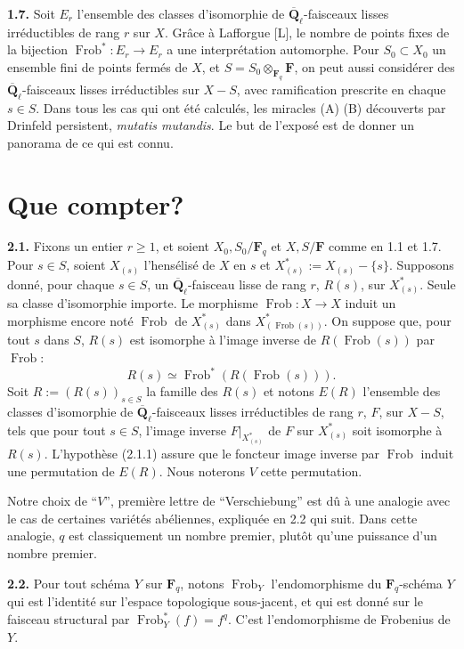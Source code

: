 \documentclass[11pt]{article}
\newcommand{\Fq}{\mathbf{F}_q}
\newcommand{\F}{\mathbf{F}}
\newcommand{\Qbl}{\overline{\mathbf{Q}}_{\ell}}
\newcommand{\Frob}{\operatorname{Frob}}
\newcommand{\para}[1]{\medskip\noindent\textbf{#1}\enspace}
\begin{document}
\para{1.7.} Soit \(E_r\) l'ensemble des classes d'isomorphie de \(\Qbl\)-faisceaux lisses irréductibles de rang \(r\) sur \(X\). Grâce à Lafforgue [L], le nombre de points fixes de la bijection \(\Frob^*:E_r\to E_r\) a une interprétation automorphe. Pour \(S_0\subset X_0\) un ensemble fini de points fermés de \(X\), et \(S=S_0\otimes_{\Fq}\F\), on peut aussi considérer des \(\Qbl\)-faisceaux lisses irréductibles sur \(X-S\), avec ramification prescrite en chaque \(s\in S\). Dans tous les cas qui ont été calculés, les miracles (A) (B) découverts par Drinfeld persistent, \textit{mutatis mutandis}. Le but de l'exposé est de donner un panorama de ce qui est connu.

\section{Que compter?}

\para{2.1.} Fixons un entier \(r\ge 1\), et soient \(X_0,S_0/\Fq\) et \(X,S/\F\) comme en 1.1 et 1.7. Pour \(s\in S\), soient \(X_{(s)}\) l'hensélisé de \(X\) en \(s\) et \(X_{(s)}^*:=X_{(s)}-\{s\}\). Supposons donné, pour chaque \(s\in S\), un \(\Qbl\)-faisceau lisse de rang \(r\), \(R(s)\), sur \(X_{(s)}^*\). Seule sa classe d'isomorphie importe. Le morphisme \(\Frob:X\to X\) induit un morphisme encore noté \(\Frob\) de \(X_{(s)}^*\) dans \(X_{(\Frob(s))}^*\). On suppose que, pour tout \(s\) dans \(S\), \(R(s)\) est isomorphe à l'image inverse de \(R(\Frob(s))\) par \(\Frob\):
\begin{equation}
R(s)\simeq \Frob^*(R(\Frob(s))).
\tag{2.1.1}
\end{equation}
Soit \(R:=(R(s))_{s\in S}\) la famille des \(R(s)\) et notons \(E(R)\) l'ensemble des classes d'isomorphie de \(\Qbl\)-faisceaux lisses irréductibles de rang \(r\), \(F\), sur \(X-S\), tels que pour tout \(s\in S\), l'image inverse \(F|_{X_{(s)}^*}\) de \(F\) sur \(X_{(s)}^*\) soit isomorphe à \(R(s)\). L'hypothèse (2.1.1) assure que le foncteur image inverse par \(\Frob\) induit une permutation de \(E(R)\). Nous noterons \(V\) cette permutation.

Notre choix de ``\(V\)'', première lettre de ``Verschiebung'' est dû à une analogie avec le cas de certaines variétés abéliennes, expliquée en 2.2 qui suit. Dans cette analogie, \(q\) est classiquement un nombre premier, plutôt qu'une puissance d'un nombre premier.

\para{2.2.} Pour tout schéma \(Y\) sur \(\Fq\), notons \(\Frob_Y\) l'endomorphisme du \(\Fq\)-schéma \(Y\) qui est l'identité sur l'espace topologique sous-jacent, et qui est donné sur le faisceau structural par \(\Frob_Y^*(f)=f^q\). C'est l'endomorphisme de Frobenius de \(Y\).
\end{document}
